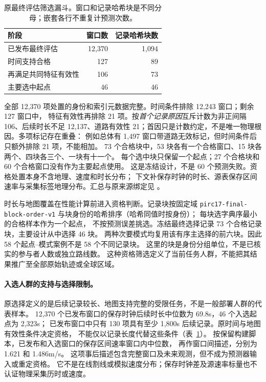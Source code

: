 \documentclass[UTF8,11pt]{ctexart}
\begin{document}
\begin{table}[htbp]
\centering\small
\caption{原最终评估筛选漏斗。窗口和记录哈希块是不同分母；嵌套各行不重复计预测次数。}
\label{tab:final-cohort-funnel}
\begin{tabular}{@{}lrr@{}}
\toprule
阶段 & 窗口数 & 记录哈希块数\\
\midrule
已发布最终评估 & 12,370 & 1,094\\
时间支持合格 & 127 & 89\\
再满足共同特征有效性 & 106 & 73\\
主要选中起点 & 46 & 46\\
\bottomrule
\end{tabular}
\end{table}
全部 12,370 项处置的身份和索引元数据完整。时间条件排除 12,243 窗口；剩余 127 窗口中，
特征有效性再排除 21 项。按\emph{首个记录原因}互斥计数为非正间隔 106、后续时长不足
12,137、道路有效性 21；首因只是计数约定，不是唯一物理根因。多项标记存在重叠：
例如总体有 1,497 窗口带道路无效标记，但时间条件后只额外排除 21 项，不能相加。
73 个合格块中，53 块各有一个合格窗口、15 块各两个、四块各三个、一块有十一个。
每个选中块只保留一个起点；27 个合格块和 60 个合格窗口没有作为主要起点使用。
这是冻结设计，不是 60 个预测失败。资格处置本身不含地理、速度和时长分布；
下文补保存时钟的时长、源表保存区间速率与采集标签地理分布。汇总与原来源绑定见
。

时长与地图覆盖在性能计算前进入资格判断。记录块按固定域
\texttt{pirc17-final-block-order-v1} 与块身份的哈希排序（哈希同值时按身份）；
每块选字典序最小的合格样本作为一个起点，
不按预测误差挑选。冻结最终选择记录 73 个合格记录块，主要设计从中选择 46 块。
两种次要模式均复用该有序主选择的前六块。因此 58 个起点--模式案例不是 58 个不同记录块。
这里的块是身份分组单位，不是已核实的参与者人数或独立路线数。
这种资格筛选定义了当前任务人群，不能把其结果推广至全部原始轨迹或全球区域。

\paragraph{入选人群的支持与选择限制。}\label{sec:population-support-summary}
原选择定义的是后续记录较长、地图支持完整的受限任务，不是一般部署人群的代表样本。
12,370 个已发布窗口的保存时钟后续时长中位数为 69.8s，46 个入选起点为 2,323s；
已发布窗口中只有 130 项具有至少 1,800s 后续记录。原时间与地图有效性条件决定资格，
不能仅以记录长度代替这些条件（表~\ref{tab:final-cohort-funnel}）。
按保留构建脚本，已发布和入选窗口的保存区间速率窗口内中位数，
再作窗口间描述，分别为 1.621 和 1.486m/s。
这项事后描述包含完整窗口及未来观测，但不成为预测器输入或重定资格。
它不是在线割线或模拟速度分布；保存时钟差及源速率标量也不认证物理采集历时或速度。
\end{document}
